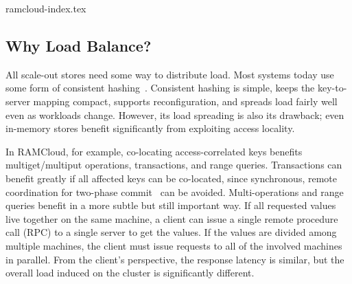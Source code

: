  {ramcloud-index.tex}

%


\subsection{Why Load Balance?}
\label{sec:why-balance}

All scale-out stores need some way to distribute load. Most systems today use
some form of consistent
hashing~\cite{chord,dynamo,cassandra}. Consistent hashing is simple,
keeps the key-to-server mapping compact, supports reconfiguration, and
spreads load fairly well even as workloads change. However, its
load spreading is also its drawback; even in-memory stores benefit
significantly from exploiting access locality.

In RAMCloud, for example, co-locating access-correlated keys benefits
multiget/multiput operations, transactions, and range queries. Transactions can
benefit greatly if all affected keys can be co-located, since synchronous, remote
coordination for two-phase commit~\cite{ramcloud-rifl,sinfonia} can be avoided.
Multi-operations and range queries benefit in a more subtle but still important
way. If all requested values live together on the same machine, a client can
issue a single remote procedure call (RPC) to a single server to get
the values. If the values are divided among multiple machines, the client must
issue requests to all of the involved machines in parallel. From the client's
perspective, the response latency is similar, but the overall load
induced on the cluster is significantly different.

